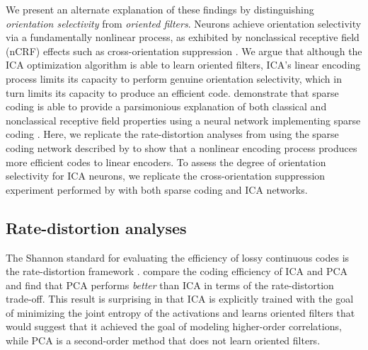 We present an alternate explanation of these findings by distinguishing \textit{orientation selectivity} from \textit{oriented filters}. Neurons achieve orientation selectivity via a fundamentally nonlinear process, as exhibited by nonclassical receptive field (nCRF) effects such as cross-orientation suppression \parencite{golden2016conjectures, zhu2013visual}. We argue that although the ICA optimization algorithm is able to learn oriented filters, ICA's linear encoding process limits its capacity to perform genuine orientation selectivity, which in turn limits its capacity to produce an efficient code.  demonstrate that sparse coding is able to provide a parsimonious explanation of both classical and nonclassical receptive field properties using a neural network implementing sparse coding \parencite{zhu2013visual}. Here, we replicate the rate-distortion analyses from  using the sparse coding network described by  to show that a nonlinear encoding process produces more efficient codes to linear encoders. To assess the degree of orientation selectivity for ICA neurons, we replicate the cross-orientation suppression experiment performed by  with both sparse coding and ICA networks.


\subsection{Rate-distortion analyses}
The Shannon standard for evaluating the efficiency of lossy continuous codes is the rate-distortion framework \parencite{cover2012elements}.  compare the  coding efficiency of ICA and PCA and find that PCA performs \textit{better} than ICA in terms of the rate-distortion trade-off. This result is surprising in that ICA is explicitly trained with the goal of minimizing the joint entropy of the activations and learns oriented filters that would suggest that it achieved the goal of modeling higher-order correlations, while PCA is a second-order method that does not learn oriented filters.

